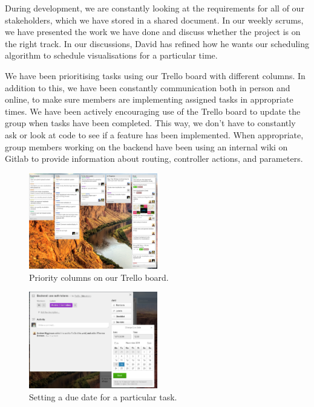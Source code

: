 \documentclass[a4paper]{article}
\begin{document}
During development, we are constantly looking at the requirements for 
all of our stakeholders, which 
we have stored in a shared document. In our weekly scrums, we have 
presented the work we have done and discuss whether the project is on the 
right track. In our discussions, David has refined how he wants our
scheduling algorithm to schedule visualisations for a particular time. 



We have been prioritising tasks using our Trello board with different
columns. In addition to this, we have been constantly communication both 
in person and online, to make sure members are implementing assigned tasks
in appropriate times. We have been actively encouraging use of the Trello 
board to update the group when tasks have been completed. This way, 
we don't have to constantly ask or look at code to see if a feature has 
been implemented. When appropriate, group members working on the backend
have been using an internal wiki on Gitlab to provide information about
routing, controller actions, and parameters. 


\begin{figure}[H]
  \centering
    \includegraphics[width = 0.5\textwidth]{./evaluation/trello-columns.png}

  \caption{Priority columns on our Trello board.}
  \label{fig:columns}
\end{figure}


\begin{figure}[H]
  \centering
    \includegraphics[width = 0.5\textwidth]{./evaluation/trello-due-date.png}

  \caption{Setting a due date for a particular task.}
  \label{fig:deadline}
\end{figure}
\end{document}
